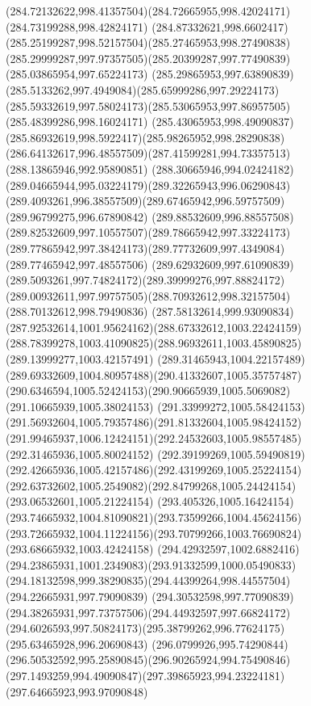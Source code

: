 {{		\curveto(284.72132622,998.41357504)(284.72665955,998.42024171)(284.73199288,998.42824171)
		\curveto(284.87332621,998.6602417)(285.25199287,998.52157504)(285.27465953,998.27490838)
		\curveto(285.29999287,997.97357505)(285.20399287,997.77490839)(285.03865954,997.65224173)
		\curveto(285.29865953,997.63890839)(285.5133262,997.4949084)(285.65999286,997.29224173)
		\curveto(285.59332619,997.58024173)(285.53065953,997.86957505)(285.48399286,998.16024171)
		\curveto(285.43065953,998.49090837)(285.86932619,998.5922417)(285.98265952,998.28290838)
		\curveto(286.64132617,996.48557509)(287.41599281,994.73357513)(288.13865946,992.95890851)
		\curveto(288.30665946,994.02424182)(289.04665944,995.03224179)(289.32265943,996.06290843)
		\curveto(289.4093261,996.38557509)(289.67465942,996.59757509)(289.96799275,996.67890842)
		\curveto(289.88532609,996.88557508)(289.82532609,997.10557507)(289.78665942,997.33224173)
		\curveto(289.77865942,997.38424173)(289.77732609,997.4349084)(289.77465942,997.48557506)
		\curveto(289.62932609,997.61090839)(289.5093261,997.74824172)(289.39999276,997.88824172)
		\curveto(289.00932611,997.99757505)(288.70932612,998.32157504)(288.70132612,998.79490836)
		\curveto(287.58132614,999.93090834)(287.92532614,1001.95624162)(288.67332612,1003.22424159)
		\curveto(288.78399278,1003.41090825)(288.96932611,1003.45890825)(289.13999277,1003.42157491)
		\curveto(289.31465943,1004.22157489)(289.69332609,1004.80957488)(290.41332607,1005.35757487)
		\curveto(290.6346594,1005.52424153)(290.90665939,1005.5069082)(291.10665939,1005.38024153)
		\curveto(291.33999272,1005.58424153)(291.56932604,1005.79357486)(291.81332604,1005.98424152)
		\curveto(291.99465937,1006.12424151)(292.24532603,1005.98557485)(292.31465936,1005.80024152)
		\curveto(292.39199269,1005.59490819)(292.42665936,1005.42157486)(292.43199269,1005.25224154)
		\curveto(292.63732602,1005.2549082)(292.84799268,1005.24424154)(293.06532601,1005.21224154)
		\curveto(293.405326,1005.16424154)(293.74665932,1004.81090821)(293.73599266,1004.45624156)
		\curveto(293.72665932,1004.11224156)(293.70799266,1003.76690824)(293.68665932,1003.42424158)
		\curveto(294.42932597,1002.6882416)(294.23865931,1001.2349083)(293.91332599,1000.05490833)
		\curveto(294.18132598,999.38290835)(294.44399264,998.44557504)(294.22665931,997.79090839)
		\curveto(294.30532598,997.77090839)(294.38265931,997.73757506)(294.44932597,997.66824172)
		\curveto(294.6026593,997.50824173)(295.38799262,996.77624175)(295.63465928,996.20690843)
		\curveto(296.0799926,995.74290844)(296.50532592,995.25890845)(296.90265924,994.75490846)
		\curveto(297.1493259,994.49090847)(297.39865923,994.23224181)(297.64665923,993.97090848)
}}

